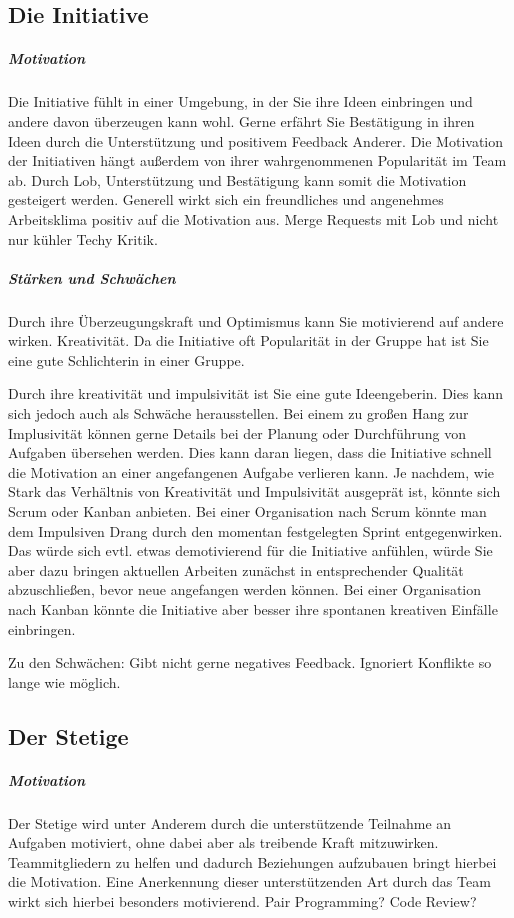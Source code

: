\documentclass[twocolumn,10pt]{asme2ej}
\begin{document}
\subsection{Die Initiative}
\subparagraph{Motivation}

Die Initiative fühlt in einer Umgebung, in der Sie ihre Ideen einbringen und andere davon überzeugen kann wohl. Gerne erfährt Sie Bestätigung in ihren Ideen durch die Unterstützung und positivem Feedback Anderer. Die Motivation der Initiativen hängt außerdem von ihrer wahrgenommenen Popularität im Team ab. Durch Lob, Unterstützung und Bestätigung kann somit die Motivation gesteigert werden. Generell wirkt sich ein freundliches und angenehmes Arbeitsklima positiv auf die Motivation aus.  Merge Requests mit Lob und nicht nur kühler Techy Kritik. 

\subparagraph{Stärken und Schwächen}
Durch ihre Überzeugungskraft und Optimismus kann Sie motivierend auf andere wirken. 
Kreativität. 
Da die Initiative oft Popularität in der Gruppe hat ist Sie eine gute Schlichterin in einer Gruppe.

Durch ihre kreativität und impulsivität ist Sie eine gute Ideengeberin. Dies kann sich jedoch auch als Schwäche herausstellen. Bei einem zu großen Hang zur Implusivität können gerne Details bei der Planung oder Durchführung von Aufgaben übersehen werden. Dies kann daran liegen, dass die Initiative schnell die Motivation an einer angefangenen Aufgabe verlieren kann. Je nachdem, wie Stark das Verhältnis von Kreativität und Impulsivität ausgeprät ist, könnte sich Scrum oder Kanban anbieten. Bei einer Organisation nach Scrum könnte man dem Impulsiven Drang durch den momentan festgelegten Sprint entgegenwirken. Das würde sich evtl. etwas demotivierend für die Initiative anfühlen, würde Sie aber dazu bringen aktuellen Arbeiten zunächst in entsprechender Qualität abzuschließen, bevor neue angefangen werden können. Bei einer Organisation nach Kanban könnte die Initiative aber besser ihre spontanen kreativen Einfälle einbringen.

Zu den Schwächen: 
Gibt nicht gerne negatives Feedback. Ignoriert Konflikte so lange wie möglich. 


\subsection{Der Stetige}
\subparagraph{Motivation}

Der Stetige wird unter Anderem durch die unterstützende Teilnahme an Aufgaben motiviert, ohne dabei aber als treibende Kraft mitzuwirken. Teammitgliedern zu helfen und dadurch Beziehungen aufzubauen bringt hierbei die Motivation. Eine Anerkennung dieser unterstützenden Art durch das Team wirkt sich hierbei besonders motivierend. Pair Programming? Code Review?	
 
\end{document}
